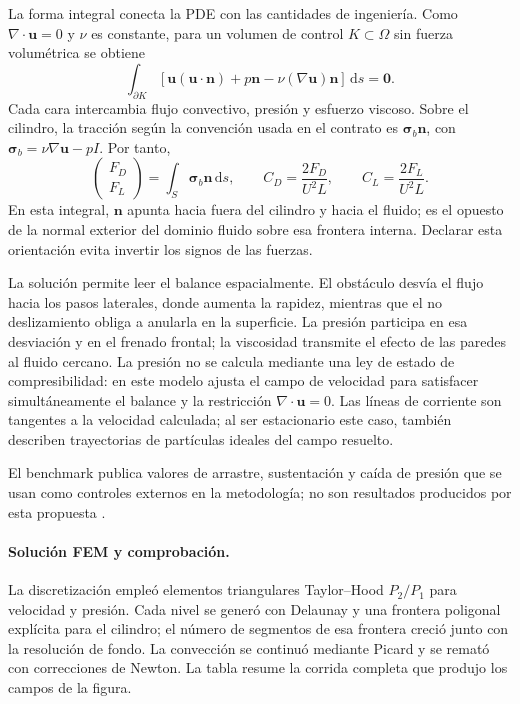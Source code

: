 La forma integral conecta la PDE con las cantidades de ingeniería. Como
$\nabla\cdot\mathbf u=0$ y $\nu$ es constante, para un volumen de control
$K\subset\Omega$ sin fuerza volumétrica se obtiene
\begin{equation}
\int_{\partial K}
\left[\mathbf u(\mathbf u\cdot\mathbf n)+p\mathbf n
      -\nu(\nabla\mathbf u)\mathbf n\right]\,\mathrm d s=\mathbf0.
\label{eq:expansion-p4-integral}
\end{equation}
Cada cara intercambia flujo convectivo, presión y esfuerzo viscoso. Sobre el
cilindro, la tracción según la convención usada en el contrato es
$\boldsymbol\sigma_b\mathbf n$, con
$\boldsymbol\sigma_b=\nu\nabla\mathbf u-pI$. Por tanto,
\begin{equation}
\begin{pmatrix}F_D\\F_L\end{pmatrix}
 =\int_S\boldsymbol\sigma_b\mathbf n\,\mathrm d s,
\qquad
C_D=\frac{2F_D}{U^2L},
\qquad
C_L=\frac{2F_L}{U^2L}.
\label{eq:expansion-p4-forces}
\end{equation}
En esta integral, $\mathbf n$ apunta hacia fuera del cilindro y hacia el
fluido; es el opuesto de la normal exterior del dominio fluido sobre esa
frontera interna. Declarar esta orientación evita invertir los signos de
las fuerzas.

La solución permite leer el balance espacialmente. El obstáculo desvía el
flujo hacia los pasos laterales, donde aumenta la rapidez, mientras que el
no deslizamiento obliga a anularla en la superficie. La presión participa
en esa desviación y en el frenado frontal; la viscosidad transmite el efecto
de las paredes al fluido cercano. La presión no se calcula mediante una
ley de estado de compresibilidad: en este modelo ajusta el campo de
velocidad para satisfacer simultáneamente el balance y la restricción
$\nabla\!\cdot\mathbf u=0$. Las líneas de corriente son tangentes a la
velocidad calculada; al ser estacionario este caso, también describen
trayectorias de partículas ideales del campo resuelto.

El benchmark publica valores de arrastre, sustentación y caída de presión que
se usan como controles externos en la metodología; no son resultados
producidos por esta propuesta \cite{dfgRe20}.

\paragraph{Solución FEM y comprobación.}
La discretización empleó elementos triangulares Taylor--Hood \(P_2/P_1\) para
velocidad y presión. Cada nivel se generó con Delaunay y una frontera
poligonal explícita para el cilindro; el número de segmentos de esa frontera
creció junto con la resolución de fondo. La convección se continuó mediante
Picard y se remató con correcciones de Newton. La tabla resume la corrida
completa que produjo los campos de la figura.

